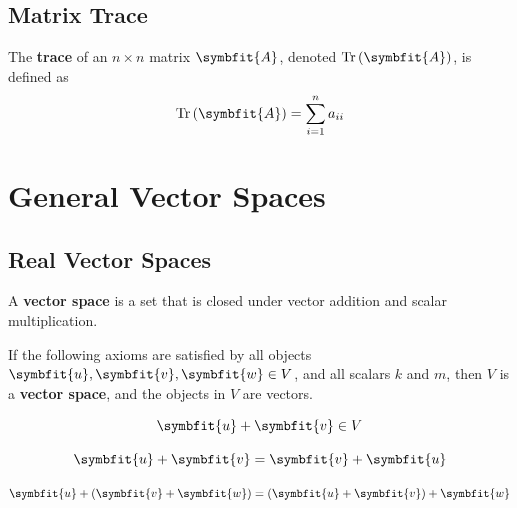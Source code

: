 \documentclass{article}
\begin{document}
	\subsection{Matrix Trace}
	\begin{definition}
		The \textbf{trace} of an $n \times n$ matrix $\symbfit{A}$, denoted $\tr{\left( \symbfit{A} \right)}$, is defined as
		\begin{equation*}
			\tr{\left( \symbfit{A} \right)} = \sum_{i=1}^n a_{ii}
		\end{equation*}
	\end{definition}
	\newpage
\section{General Vector Spaces}
	\subsection{Real Vector Spaces}
	\begin{definition}
		A \textbf{vector space} is a set that is closed under vector addition and scalar \linebreak multiplication.
	\end{definition}
	\begin{theorem}
		If the following axioms are satisfied by all objects $\symbfit{u},\symbfit{v},\symbfit{w} \in V$, and all scalars $k$ and $m$, then $V$ is a \textbf{vector space}, and the objects in $V$ are vectors.
	\end{theorem}
	\begin{axiom} 
		\begin{equation*} \label{axiom:5_1_1}
			\symbfit{u}+\symbfit{v} \in V 
		\end{equation*}
	\end{axiom}
	\begin{axiom} 
		\begin{equation*} \label{axiom:5_1_2}
			\symbfit{u} + \symbfit{v} = \symbfit{v} + \symbfit{u}
		\end{equation*}
	\end{axiom}
	\begin{axiom} 
		\begin{equation*} \label{axiom:5_1_3}
			\symbfit{u} + \left(\symbfit{v} + \symbfit{w}\right) = \left(\symbfit{u} + \symbfit{v}\right) + \symbfit{w}
		\end{equation*}
	\end{axiom}
\end{document}
